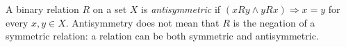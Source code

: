 
A binary relation $R$ on a set $X$ is \emph{antisymmetric} if $(xRy\land yRx)\Rightarrow x=y$ for every $x,y\in X$. Antisymmetry does not mean that $R$ is the negation of a symmetric relation: a relation can be both symmetric and antisymmetric.
